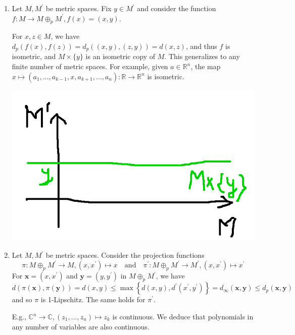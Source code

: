 \documentclass[a4paper,11pt]{article}
\begin{document}
\begin{example}
\begin{enumerate}
        \item Let $M, M^{\prime}$ be metric spaces.
        Fix $y \in M^{\prime}$ and consider the function $f: M \rightarrow M \oplus_p M^{\prime}, f(x)=(x, y)$. 
        
        For $x, z \in M$, we have $d_p(f(x), f(z))=d_p((x, y),(z, y))=d(x, z)$, and thus $f$ is isometric, and $M \times\{y\}$ is an isometric copy of $M$.
        This generalizes to any finite number of metric spaces. For example, given $a \in \mathbb{R}^n$, the map $x \mapsto\left(a_1, \ldots, a_{k-1}, x, a_{k+1}, \ldots, a_n\right): \mathbb{R} \rightarrow \mathbb{R}^n$ is isometric.

        \begin{center}
            \includegraphics[scale=0.2]{at2.png}
        \end{center}
        
        \item Let $M, M^{\prime}$ be metric spaces. Consider the projection functions
        \[
            \pi: M \oplus_p M^{\prime} \rightarrow M,\left(x, x^{\prime}\right) \mapsto x \quad \text{and}\quad \pi^{\prime}: M \oplus_p M^{\prime} \rightarrow M^{\prime},\left(x, x^{\prime}\right) \mapsto x^{\prime}
        \]
        For $\mathbf{x}=\left(x, x^{\prime}\right)$ and $\mathbf{y}=\left(y, y^{\prime}\right)$ in $M \oplus_p M^{\prime}$, we have
        \[
        d(\pi(\mathbf{x}), \pi(\mathbf{y}))=d(x, y) \leqslant \max \left\{d(x, y), d^{\prime}\left(x^{\prime}, y^{\prime}\right)\right\}=d_{\infty}(\mathbf{x}, \mathbf{y}) \leqslant d_p(\mathbf{x}, \mathbf{y})
        \]
        and so $\pi$ is 1-Lipschitz. The same holds for $\pi^{\prime}$.

        E.g., $\mathbb{C}^n \rightarrow \mathbb{C},\left(z_1, \ldots, z_n\right) \mapsto z_k$ is continuous. We deduce that polynomials in any number of variables are also continuous.
    \end{enumerate}
\end{example}
\end{document}
